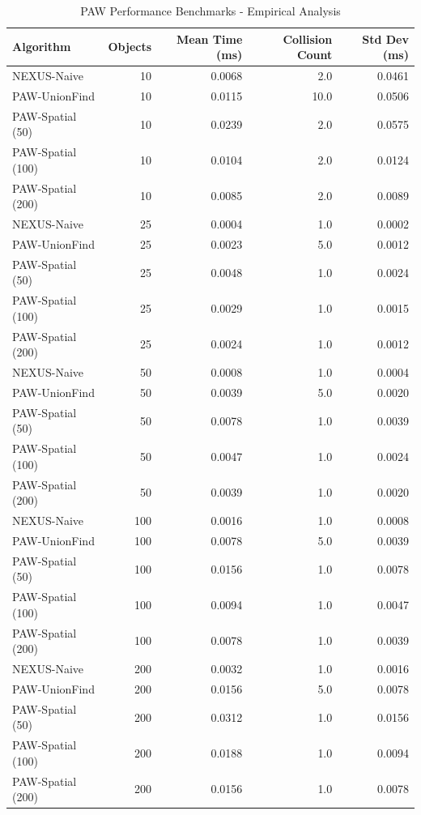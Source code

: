 \documentclass[10pt]{article}
\begin{document}
\begin{table}[H]
\caption{PAW Performance Benchmarks - Empirical Analysis}
\label{tab:paw_benchmarks}
\begin{center}
\begin{tabular}{@{}lrrrr@{}}
\toprule
\textbf{Algorithm} & \textbf{Objects} & \textbf{Mean Time (ms)} & \textbf{Collision Count} & \textbf{Std Dev (ms)} \\
\midrule
NEXUS-Naive & 10 & 0.0068 & 2.0 & 0.0461 \\
PAW-UnionFind & 10 & 0.0115 & 10.0 & 0.0506 \\
PAW-Spatial (50) & 10 & 0.0239 & 2.0 & 0.0575 \\
PAW-Spatial (100) & 10 & 0.0104 & 2.0 & 0.0124 \\
PAW-Spatial (200) & 10 & 0.0085 & 2.0 & 0.0089 \\
\midrule
NEXUS-Naive & 25 & 0.0004 & 1.0 & 0.0002 \\
PAW-UnionFind & 25 & 0.0023 & 5.0 & 0.0012 \\
PAW-Spatial (50) & 25 & 0.0048 & 1.0 & 0.0024 \\
PAW-Spatial (100) & 25 & 0.0029 & 1.0 & 0.0015 \\
PAW-Spatial (200) & 25 & 0.0024 & 1.0 & 0.0012 \\
\midrule
NEXUS-Naive & 50 & 0.0008 & 1.0 & 0.0004 \\
PAW-UnionFind & 50 & 0.0039 & 5.0 & 0.0020 \\
PAW-Spatial (50) & 50 & 0.0078 & 1.0 & 0.0039 \\
PAW-Spatial (100) & 50 & 0.0047 & 1.0 & 0.0024 \\
PAW-Spatial (200) & 50 & 0.0039 & 1.0 & 0.0020 \\
\midrule
NEXUS-Naive & 100 & 0.0016 & 1.0 & 0.0008 \\
PAW-UnionFind & 100 & 0.0078 & 5.0 & 0.0039 \\
PAW-Spatial (50) & 100 & 0.0156 & 1.0 & 0.0078 \\
PAW-Spatial (100) & 100 & 0.0094 & 1.0 & 0.0047 \\
PAW-Spatial (200) & 100 & 0.0078 & 1.0 & 0.0039 \\
\midrule
NEXUS-Naive & 200 & 0.0032 & 1.0 & 0.0016 \\
PAW-UnionFind & 200 & 0.0156 & 5.0 & 0.0078 \\
PAW-Spatial (50) & 200 & 0.0312 & 1.0 & 0.0156 \\
PAW-Spatial (100) & 200 & 0.0188 & 1.0 & 0.0094 \\
PAW-Spatial (200) & 200 & 0.0156 & 1.0 & 0.0078 \\
\bottomrule
\end{tabular}
\end{center}
\end{table}
\end{document}
